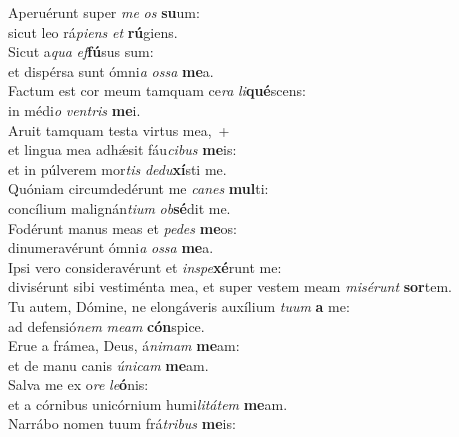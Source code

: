 \oddverse Aperuérunt super \textit{me} \textit{os} \textbf{su}um:~\*\\
\oddverse sicut leo rá\textit{pi}\textit{ens} \textit{et} \textbf{rú}giens.\\
\evenverse Sicut a\textit{qua} \textit{ef}\textbf{fú}sus sum:~\*\\
\evenverse et dispérsa sunt ómni\textit{a} \textit{os}\textit{sa} \textbf{me}a.\\
\oddverse Factum est cor meum tamquam ce\textit{ra} \textit{li}\textbf{qué}scens:~\*\\
\oddverse in médi\textit{o} \textit{ven}\textit{tris} \textbf{me}i.\\
\evenverse Aruit tamquam testa virtus mea,~+\\
\evenverse  et lingua mea adhǽsit fáu\textit{ci}\textit{bus} \textbf{me}is:~\*\\
\evenverse et in púlverem mor\textit{tis} \textit{de}\textit{du}\textbf{xí}sti me.\\
\oddverse Quóniam circumdedérunt me \textit{ca}\textit{nes} \textbf{mul}ti:~\*\\
\oddverse concílium malignán\textit{ti}\textit{um} \textit{ob}\textbf{sé}dit me.\\
\evenverse Fodérunt manus meas et \textit{pe}\textit{des} \textbf{me}os:~\*\\
\evenverse dinumeravérunt ómni\textit{a} \textit{os}\textit{sa} \textbf{me}a.\\
\oddverse Ipsi vero consideravérunt et \textit{in}\textit{spe}\textbf{xé}runt me:~\*\\
\oddverse divisérunt sibi vestiménta mea, et super vestem meam \textit{mi}\textit{sé}\textit{runt} \textbf{sor}tem.\\
\evenverse Tu autem, Dómine, ne elongáveris auxílium \textit{tu}\textit{um} \textbf{a} me:~\*\\
\evenverse ad defensió\textit{nem} \textit{me}\textit{am} \textbf{cón}spice.\\
\oddverse Erue a frámea, Deus, á\textit{ni}\textit{mam} \textbf{me}am:~\*\\
\oddverse et de manu canis \textit{ú}\textit{ni}\textit{cam} \textbf{me}am.\\
\evenverse Salva me ex o\textit{re} \textit{le}\textbf{ó}nis:~\*\\
\evenverse et a córnibus unicórnium humi\textit{li}\textit{tá}\textit{tem} \textbf{me}am.\\
\oddverse Narrábo nomen tuum frá\textit{tri}\textit{bus} \textbf{me}is:~\*\\
